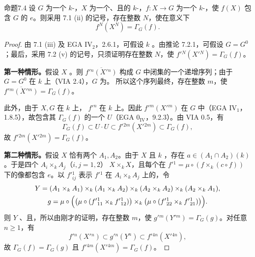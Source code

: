 \begin{SGAresult}{命题}{7.4}
设 $G$ 为一个 $k$-，$X$ 为一个、且的 $k$-，$f:X\to G$ 为一个 $k$-，使 $f(X)$ 包含 $G$ 的 $e$。则采用 7.1 (ii) 的记号，存在整数 $N$，使在意义下
\[
f^N(X^N)=\Gamma_G(f).
\]
\end{SGAresult}
\begin{proof}
由 7.1 (iii) 及 EGA $\mathrm{IV}_2$，2.6.1，可假设 $k$ 。由推论 7.2.1，可假设 $G=G^0$；最后，采用 7.2 (v) 的记号，只须证明存在整数 $N$，使 $f'{}^N(X'{}^N)=\Gamma_G(f)$。

\textbf{第一种情形。}假设 $X$ 。则 $\overline{f'{}^n(X'{}^n)}$ 构成 $G$ 中闭集的一个递增序列；由于 $G=G^0$ 在 $k$ 上（VIA 2.4），$G$ 为。
所以这个序列最终，存在整数 $m$，使 $\overline{f'{}^m(X'{}^m)}=\Gamma_G(f)$。

此外，由于 $X,G$ 在 $k$ 上， $f'{}^n$ 在 $k$ 上。因此 $f'{}^m(X'{}^m)$ 在 $G$ 中（EGA $\mathrm{IV}_1$，1.8.5），故包含其 $\Gamma_G(f)$ 的一个 $U$（EGA $0_{\mathrm{IV}}$，9.2.3）。由 VIA 0.5，有
\[
\Gamma_G(f)\subset U\cdot U\subset f'{}^{2m}(X'{}^{2m})\subset\Gamma_G(f),
\]
故 $f'{}^{2m}(X'{}^{2m})=\Gamma_G(f)$。

\textbf{第二种情形。}假设 $X$ 恰有两个 $A_1,A_2$。由于 $X$ 且 $k$ ，存在 $a\in(A_1\cap A_2)(k)$。于是四个 $A_i\times_k A_j$（$i,j=1,2$） $X\times_k X$，且每个在 $f'{}^1=\mu\circ(f\times_k(c\circ f))$ 下的像都包含 $e$。以 $f'{}^1_{ij}$ 表示 $f'{}^1$ 在 $A_i\times_k A_j$ 上的，令
\[
\begin{gathered}
Y=(A_1\times_k A_1)\times_k(A_1\times_k A_2)
\times_k(A_2\times_k A_2)\times_k(A_2\times_k A_1),\\
g=\mu\circ\Bigl(\bigl(\mu\circ(f'{}^1_{11}\times_k f'{}^1_{12})\bigr)
\times_k\bigl(\mu\circ(f'{}^1_{22}\times_k f'{}^1_{21})\bigr)\Bigr).
\end{gathered}
\]
则 $Y$ 、且，所以由刚才的证明，存在整数 $m$，使 $g'{}^m(Y'{}^m)=\Gamma_G(g)$。对任意 $n\geq1$，有
\[
f'{}^n(X'{}^n)\subset g'{}^n(Y^n)\subset f'{}^{4n}(X'{}^{4n}),
\]
故 $\Gamma_G(f)=\Gamma_G(g)$ 且 $f'{}^{4m}(X'{}^{4m})=\Gamma_G(f)$。


\end{proof}
